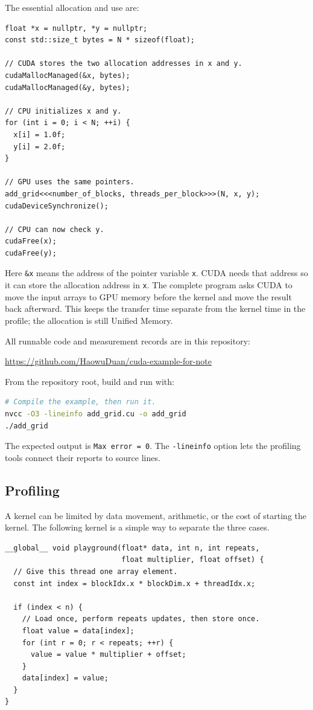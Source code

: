 \documentclass[11pt]{article}
\numberwithin{equation}{section}
\numberwithin{figure}{section}
\numberwithin{table}{section}
\newcommand{\code}[1]{\texttt{#1}}
\begin{document}
The essential allocation and use are:
\begin{lstlisting}[language=CUDA,basicstyle=\ttfamily\footnotesize]
float *x = nullptr, *y = nullptr;
const std::size_t bytes = N * sizeof(float);

// CUDA stores the two allocation addresses in x and y.
cudaMallocManaged(&x, bytes);
cudaMallocManaged(&y, bytes);

// CPU initializes x and y.
for (int i = 0; i < N; ++i) {
  x[i] = 1.0f;
  y[i] = 2.0f;
}

// GPU uses the same pointers.
add_grid<<<number_of_blocks, threads_per_block>>>(N, x, y);
cudaDeviceSynchronize();

// CPU can now check y.
cudaFree(x);
cudaFree(y);
\end{lstlisting}
Here \code{\&x} means the address of the pointer variable \code{x}.  CUDA needs
that address so it can store the allocation address in \code{x}.  The complete
program asks CUDA to move the input arrays to GPU memory before the kernel and move
the result back afterward.  This keeps the transfer time separate from the kernel
time in the profile; the allocation is still Unified Memory.

All runnable code and measurement records are in this repository:
\begin{center}
  \url{https://github.com/HaowuDuan/cuda-example-for-note}
\end{center}
From the repository root, build and run  with:
\begin{lstlisting}[language=bash,numbers=none]
# Compile the example, then run it.
nvcc -O3 -lineinfo add_grid.cu -o add_grid
./add_grid
\end{lstlisting}
The expected output is \code{Max error = 0}.  The \code{-lineinfo} option lets the
profiling tools connect their reports to source lines.

\subsection{Profiling}
\label{chap:profiling}

A kernel can be limited by data movement, arithmetic, or the cost of starting the
kernel.  The following kernel is a simple way to separate the three cases.
\begin{lstlisting}[language=CUDA,caption={One kernel used with different array and loop sizes.}]
__global__ void playground(float* data, int n, int repeats,
                           float multiplier, float offset) {
  // Give this thread one array element.
  const int index = blockIdx.x * blockDim.x + threadIdx.x;

  if (index < n) {
    // Load once, perform repeats updates, then store once.
    float value = data[index];
    for (int r = 0; r < repeats; ++r) {
      value = value * multiplier + offset;
    }
    data[index] = value;
  }
}
\end{lstlisting}
\end{document}
